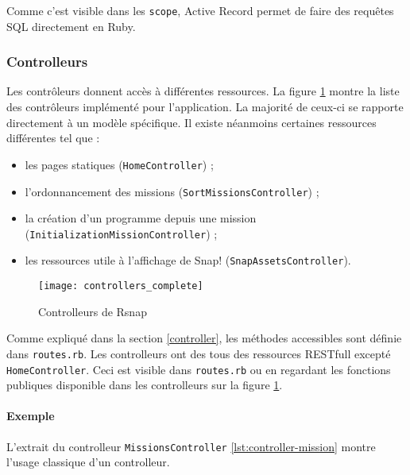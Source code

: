 Comme c'est visible dans les \texttt{scope}, Active Record permet de faire des requêtes SQL directement en Ruby. 


\subsubsection{Controlleurs}
Les contrôleurs donnent accès à différentes ressources. La figure \ref{fig:controllers} montre la liste des contrôleurs implémenté pour l'application. La majorité de ceux-ci se rapporte directement à un modèle spécifique. Il existe néanmoins certaines ressources différentes tel que : 
\begin{itemize}
  \item les pages statiques (\texttt{HomeController}) ;
  \item l'ordonnancement des missions (\texttt{SortMissionsController}) ; 
  \item la création d'un programme depuis une mission (\texttt{InitializationMissionController}) ;
  \item les ressources utile à l'affichage de Snap! (\texttt{SnapAssetsController}).
\end{itemize}
\begin{figure}
 \begin{center}
   \texttt{[image: controllers\_complete]}
   \caption{Controlleurs de Rsnap}
   \label{fig:controllers}
 \end{center}
\end{figure}

Comme expliqué dans la section \ref{controller}, les méthodes accessibles sont définie dans \texttt{routes.rb}. Les controlleurs ont des tous des ressources RESTfull excepté \texttt{HomeController}. Ceci est visible dans \texttt{routes.rb} ou en regardant les fonctions publiques disponible dans les controlleurs sur la figure \ref{fig:controllers}.

\paragraph{Exemple} 
L'extrait du controlleur \texttt{MissionsController} \ref{lst:controller-mission} montre l'usage classique d'un controlleur. 



